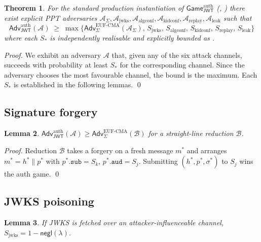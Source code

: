 \documentclass[11pt,a4paper]{article}
\theoremstyle{plain}
\newtheorem{theorem}{Theorem}
\newtheorem{lemma}[theorem]{Lemma}
\theoremstyle{definition}
\newcommand{\Adv}{\mathsf{Adv}}
\newcommand{\GameG}{\mathsf{Game}}
\newcommand{\JWT}{\mathsf{JWT}}
\newcommand{\negl}{\mathsf{negl}}
\begin{document}
\begin{theorem}
\label{thm:jwt}
For the standard production instantiation of $\GameG_\JWT^{\text{auth}}$
(, ) there exist explicit PPT adversaries
$\mathcal{A}_\Sigma, \mathcal{A}_{\text{jwks}}, \mathcal{A}_{\text{algconf}},
\mathcal{A}_{\text{kidconf}}, \mathcal{A}_{\text{replay}},
\mathcal{A}_{\text{leak}}$ such that
\[
\Adv_\JWT^{\text{auth}}(\mathcal{A}) \;\ge\; \max\Big\{
\Adv_\Sigma^{\mathrm{EUF\text{-}CMA}}(\mathcal{A}_\Sigma),\,
S_{\text{jwks}},\, S_{\text{algconf}},\, S_{\text{kidconf}},\,
S_{\text{replay}},\, S_{\text{leak}}
\Big\}
\]
where each $S_*$ is independently realisable and explicitly bounded as
.
\end{theorem}

\begin{proof}
We exhibit an adversary $\mathcal{A}$ that, given any of the six
attack channels, succeeds with probability at least $S_*$ for the
corresponding channel. Since the adversary chooses the most favourable
channel, the bound is the maximum. Each $S_*$ is established in the
following lemmas. \qed
\end{proof}

\subsection{Signature forgery}

\begin{lemma}
\label{lem:sigma}
$\Adv_\JWT^{\text{auth}}(\mathcal{A}) \ge \Adv_\Sigma^{\mathrm{EUF\text{-}CMA}}(\mathcal{B})$
for a straight-line reduction $\mathcal{B}$.
\end{lemma}

\begin{proof}
Reduction $\mathcal{B}$ takes a forgery on a fresh message $m^*$ and
arranges $m^* = h^* \| p^*$ with $p^*.\texttt{sub} = S_k$,
$p^*.\texttt{aud} = S_j$. Submitting $(h^*, p^*, \sigma^*)$ to $S_j$ wins
the auth game. \qed
\end{proof}

\subsection{JWKS poisoning}

\begin{lemma}
\label{lem:jwks}
If JWKS is fetched over an attacker-influenceable channel,
$S_{\text{jwks}} = 1 - \negl(\lambda)$.
\end{lemma}
\end{document}
